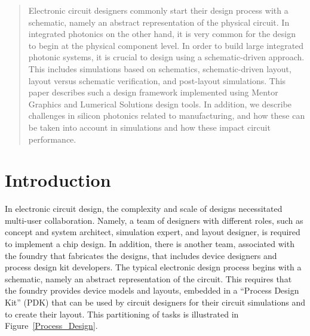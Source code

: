 \documentclass[journal]{spie}
\begin{document}
\begin{abstract}

Electronic circuit designers commonly start their design process with a schematic, namely an abstract representation of the physical circuit.  In integrated photonics on the other hand, it is very common for the design to begin at the physical component level.  In order to build large integrated photonic systems, it is crucial to design using a schematic-driven approach.  This includes simulations based on schematics, schematic-driven layout, layout versus schematic verification, and post-layout simulations.   This paper  describes such a design framework implemented using Mentor Graphics and Lumerical Solutions design tools.  In addition, we describe challenges in silicon photonics related to manufacturing, and how these can be taken into account in simulations and how these impact circuit performance.



\end{abstract}



\section{Introduction}\label{sec1}

In electronic circuit design, the complexity and scale of designs necessitated multi-user collaboration.  Namely, a team of designers with different roles, such as concept and system architect, simulation expert, and layout designer, is required to implement a chip design.  In addition, there is another team, associated with the foundry that fabricates the designs, that includes device designers and process design kit developers.  The typical electronic design process begins with a schematic, namely an abstract representation of the circuit.  This requires that the foundry provides device models and layouts, embedded in a ``Process Design Kit'' (PDK) that can be used by circuit designers for their circuit simulations and to create their layout.  This partitioning of tasks is illustrated in Figure~\ref{Process_Design}.
\end{document}
